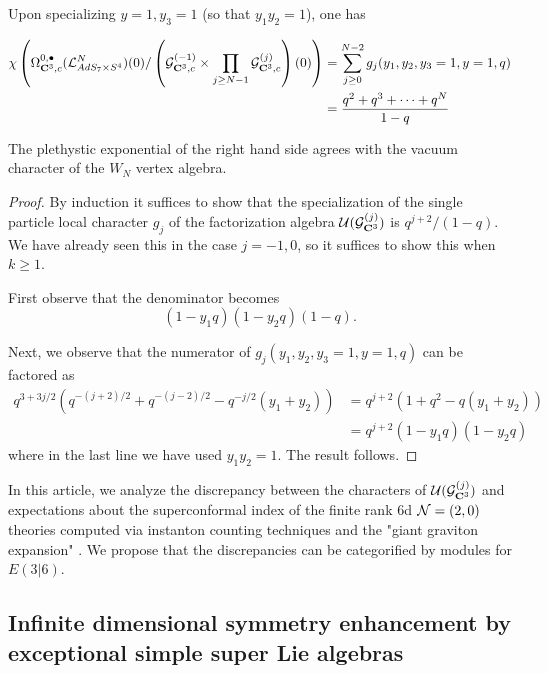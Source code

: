\begin{prop}
Upon specializing $y=1,y_3=1$ (so that $y_1 y_2 = 1$), one has 

\begin{align*}
\chi \left ( \Omega^{0,\bullet}_{\mathbf{C}^3,c} (\mathcal{L}^N_{AdS_7\times S^4})(0)/ \left ( \mathcal{G}^{(-1)}_{\mathbf{C}^3,c}\times \prod _{j\geq {N-1}} \mathcal{G}^{(j)}_{\mathbf{C}^3,c}\right )(0)\right ) & = \sum_{j \geq 0}^{N-2} g_j (y_1,y_2, y_3=1,y=1,q) \\
& = \frac{q^2 + q^3 + \cdots + q^{N}}{1-q} 
\end{align*}

The plethystic exponential of the right hand side agrees with the vacuum character of the $W_{N}$ vertex algebra.
\end{prop}
\begin{proof}
By induction it suffices to show that the specialization of the single particle local character $g_j$ of the factorization algebra $\mathcal{U}(\mathcal{G}_{\mathbf{C}^3}^{(j)})$ is $q^{j+2} / (1-q)$. 
We have already seen this in the case $j=-1,0$, so it suffices to show this when $k \geq 1$.

First observe that the denominator becomes
\begin{equation}
(1-y_1 q)(1-y_2q) (1-q) .
\end{equation}

Next, we observe that the numerator of $g_j (y_1,y_2,y_3=1,y=1,q)$ can be factored as
\begin{align*}
q^{3 + 3j/2} \left(q^{-(j+2)/2} + q^{-(j-2)/2} - q^{-j/2} (y_1+y_2) \right) 
& = q^{j+2} (1 + q^2 - q (y_1 + y_2)) \\
& = q^{j+2} (1 - y_1 q) (1-y_2 q) 
\end{align*}
where in the last line we have used $y_1 y_2 = 1$.
The result follows.
\end{proof}

\parsec{}
In this article, we analyze the discrepancy between the characters of $\mathcal{U} (\mathcal{G}^{(j)}_{\mathbf{C}^3})$ and expectations about the superconformal index of the finite rank 6d $\mathcal{N}=(2,0)$ theories computed via instanton counting techniques \cite{Kim:2013nva} and the "giant graviton expansion" \cite{Arai_2020, Imamura}. We propose that the discrepancies can be categorified by modules for $E(3|6)$.

\subsection{Infinite dimensional symmetry enhancement by exceptional simple super Lie algebras}

